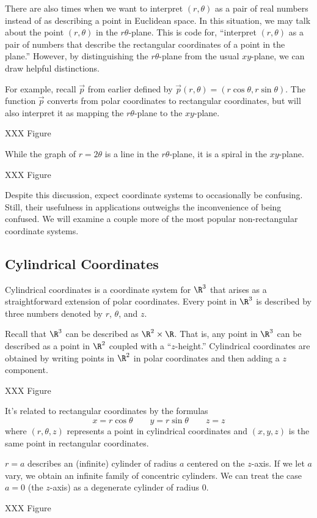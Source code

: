 There are also times when we want to interpret $(r,\theta)$ as a pair of real numbers instead
of as describing a point in Euclidean space.  In this situation, we may talk about the
point $(r,\theta)$ in the $r\theta$-plane.  This is code for, ``interpret $(r,\theta)$
as a pair of numbers that describe the rectangular coordinates of a point in the plane.''
However, by distinguishing the $r\theta$-plane from the usual $xy$-plane, we can draw helpful distinctions.

For example, recall $\vec p$ from earlier defined by $\vec p(r,\theta)=(r\cos\theta,r\sin\theta)$.  The function
$\vec p$ converts from polar coordinates to rectangular coordinates, but will also interpret it as
mapping the $r\theta$-plane to the $xy$-plane.

XXX Figure

While the graph of $r=2\theta$ is a line in the $r\theta$-plane, it is a spiral in the $xy$-plane.

XXX Figure

Despite this discussion, expect coordinate systems to occasionally be confusing.  Still,
their usefulness in applications outweighs the inconvenience of being confused.  We will examine
a couple more of the most popular non-rectangular coordinate systems.

\subsection{Cylindrical Coordinates}
Cylindrical coordinates is a coordinate system for $\R^3$
that arises as a straightforward extension of polar coordinates.  Every point in $\R^3$ is
described by three numbers denoted by $r$, $\theta$, and $z$.

Recall that $\R^3$ can be described as $\R^2\times\R$.  That is, any point in $\R^3$ can be described
as a point in $\R^2$ coupled with a ``$z$-height.''  Cylindrical coordinates are obtained by
writing points in $\R^2$ in polar coordinates and then adding a $z$ component.

XXX Figure

It's related to rectangular coordinates by the formulas
\[
	x=r\cos\theta\qquad
	y=r\sin\theta\qquad
	z=z
\]
where $(r,\theta,z)$ represents a point in cylindrical coordinates and $(x,y,z)$ is the same point in rectangular
coordinates.



\begin{example}  $r = a$ describes an (infinite) cylinder
of radius $a$ centered on the $z$-axis.  If we let $a$ vary, we
obtain an infinite family of concentric cylinders.  We can treat
the case $a = 0$ (the $z$-axis) as a degenerate cylinder of
radius 0.

XXX Figure
\end{example}

